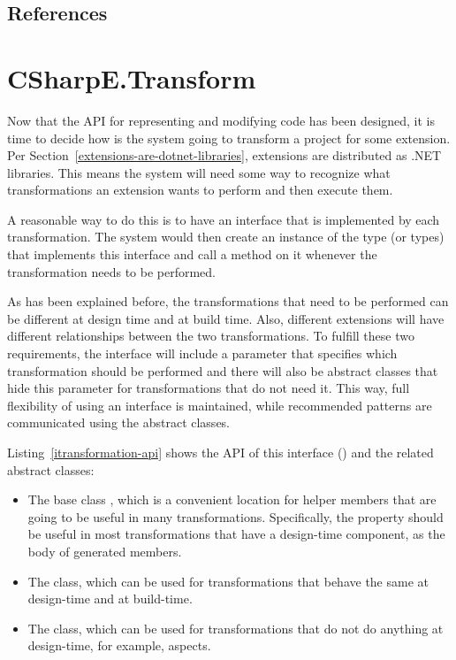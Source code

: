 \subsection{References}

\section{CSharpE.Transform}
\label{transform-design}

Now that the \ac{API} for representing and modifying code has been designed, it is time to decide how is the system going to transform a project for some extension. Per Section~\ref{extensions-are-dotnet-libraries}, extensions are distributed as .NET libraries. This means the system will need some way to recognize what transformations an extension wants to perform and then execute them.

A reasonable way to do this is to have an interface that is implemented by each transformation. The system would then create an instance of the type (or types) that implements this interface and call a method on it whenever the transformation needs to be performed.

As has been explained before, the transformations that need to be performed can be different at design time and at build time. Also, different extensions will have different relationships between the two transformations. To fulfill these two requirements, the interface will include a parameter that specifies which transformation should be performed and there will also be abstract classes that hide this parameter for transformations that do not need it. This way, full flexibility of using an interface is maintained, while recommended patterns are communicated using the abstract classes.

\medskip

Listing~\ref{itransformation-api} shows the \ac{API} of this interface () and the related abstract classes: 

\begin{itemize}
\item The base class , which is a convenient location for helper members that are going to be useful in many transformations. Specifically, the  property should be useful in most transformations that have a design-time component, as the body of generated members.
\item The  class, which can be used for transformations that behave the same at design-time and at build-time.
\item The  class, which can be used for transformations that do not do anything at design-time, for example, aspects.
\end{itemize}


